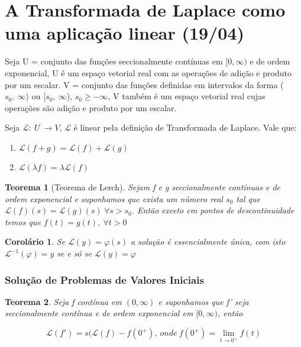 \documentclass[12pt]{article}
\newtheorem{theorem}{Teorema}[section]
\newtheorem{corollary}{Corolário}[theorem]
\begin{document}
\section{A Transformada de Laplace como uma aplicação linear (19/04)}

Seja U = {conjunto das funções seccionalmente contínuas em $[0, \infty )$ e de ordem exponencial}, U é um espaço vetorial real com as operações de adição e produto por um escalar. V = {conjunto das funções definidas em intervalos da forma ($s_0, \ \infty$) ou [$s_0, \ \infty$), $s_0 \geq - \infty$}, V também é um espaço vetorial real cujas operações são adição e produto por um escalar.

Seja $\mathscr{L}:\ U \ \xrightarrow{} V$, $\mathscr{L}$ é linear pela definição de Transformada de Laplace. Vale que:

\begin{enumerate}
    \item $\mathscr{L} (f + g) = \mathscr{L} (f) + \mathscr{L} (g)$
    
    \item $\mathscr{L} (\lambda f) = \lambda \mathscr{L}(f)$
\end{enumerate}

\begin{theorem}[Teorema de Lerch]
    Sejam f e g seccionalmente contínuas e de ordem exponencial e suponhamos que exista um número real $s_0$ tal que $\mathscr{L}(f)(s) = \mathscr{L}(g)(s) \ \forall s > s_0$. Então exceto em pontos de descontinuidade temos que $f(t) = g(t), \ \forall t > 0$
\end{theorem}

\begin{corollary}
    Se $\mathscr{L}(y) = \varphi(s)$ a solução é essencialmente única, com isto $\mathscr{L}^{-1} (\varphi) = y$ se e só se $\mathscr{L}(y) = \varphi$
\end{corollary}

\subsubsection*{Solução de Problemas de Valores Iniciais}
\begin{theorem}
    Seja f contínua em $(0, \infty)$ e suponhamos que f' seja seccionalmente contínua e de ordem exponencial em $[0, \infty)$, então
    
    $$\mathscr{L}(f') = s (\mathscr{L}(f) - f(0^+), \ onde \ f(0^+) = \lim_{t \xrightarrow{} 0^+} f(t)$$
\end{theorem}
\end{document}
